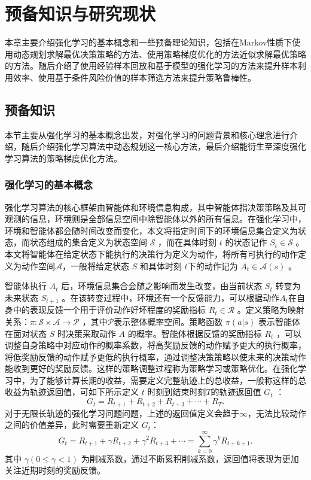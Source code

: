 
\chapter{预备知识与研究现状}\label{chap:background}

本章主要介绍强化学习的基本概念和一些预备理论知识，包括在Markov性质下使用动态规划求解最优决策策略的方法、使用策略梯度优化的方法近似求解最优策略的方法。随后介绍了使用经验样本回放和基于模型的强化学习的方法来提升样本利用效率、使用基于条件风险价值的样本筛选方法来提升策略鲁棒性。

\section{预备知识}

本节主要从强化学习的基本概念出发，对强化学习的问题背景和核心理念进行介绍，随后介绍强化学习算法中动态规划这一核心方法，最后介绍能衍生至深度强化学习算法的策略梯度优化方法。

\subsection{强化学习的基本概念}

强化学习算法的核心框架由智能体和环境信息构成，其中智能体指决策策略及其可观测的信息，环境则是全部信息空间中除智能体以外的所有信息。在强化学习中，环境和智能体都会随时间改变而变化，本文将指定时间下的环境信息集合定义为状态，而状态组成的集合定义为状态空间 $\mathcal S$ ，而在具体时刻 $t$ 的状态记作 $S_t\in \mathcal S$ 。本文将智能体在给定状态下能执行的决策行为定义为动作，将所有可执行的动作定义为动作空间$\mathcal{A}$，一般将给定状态 $S$ 和具体时刻 $t$下的动作记为 $A_t\in\mathcal{A}(s)$ 。

智能体执行 $A_t$ 后，环境信息集合会随之影响而发生改变，由当前状态 $S_t$ 转变为未来状态 $S_{t+1}$ 。在该转变过程中，环境还有一个反馈能力，可以根据动作$A_t$在自身中的表现反馈一个用于评价动作好坏程度的奖励指标 $R_{t}\in\mathcal{R}$ 。定义策略为映射关系：$\pi:\mathcal{S}\times\mathcal{A}\to \mathcal{P}$ ，其中$\mathcal P$表示整体概率空间。策略函数 $\pi(a|s)$ 表示智能体在面对状态 $S$ 时决策采取动作 $A$ 的概率。智能体根据反馈的奖励指标 $R_{t}$ ，可以调整自身策略中对应动作的概率系数，将高奖励反馈的动作赋予更大的执行概率，将低奖励反馈的动作赋予更低的执行概率，通过调整决策策略以使未来的决策动作能收到更好的奖励反馈。这样的策略调整过程称为策略学习或策略优化。在强化学习中，为了能够计算长期的收益，需要定义完整轨迹上的总收益，一般称这样的总收益为轨迹返回值，可如下所示定义 $t$ 时刻到结束时刻$T$的轨迹返回值 $G_t$ ：
\begin{equation}
G_t = R_{t+1}+R_{t+2}+R_{t+3}+\cdots+R_T.
\end{equation}
对于无限长轨迹的强化学习问题问题，上述的返回值定义会趋于$\infty$，无法比较动作之间的价值差异，此时需要重新定义 $G_t$：
\begin{equation}
G_t = R_{t+1}+\gamma R_{t+2}+\gamma^2 R_{t+3}+\cdots = \sum_{k=0}^{\infty}\gamma^kR_{t+k+1}.
\end{equation}
其中 $\gamma(0\leq \gamma < 1)$ 为削减系数，通过不断累积削减系数，返回值将表现为更加关注近期时刻的奖励反馈。

